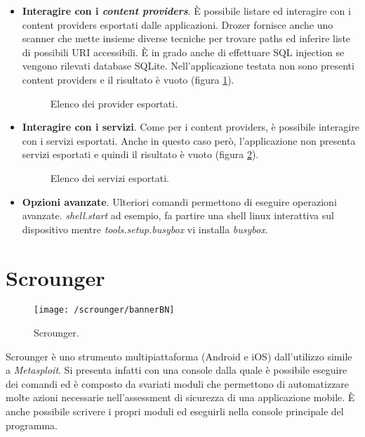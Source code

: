 \begin{itemize}
	\item \textbf{Interagire con i \emph{content providers}}. È possibile listare ed interagire con i content providers esportati dalle applicazioni. Drozer fornisce anche uno scanner che mette insieme diverse tecniche per trovare paths ed inferire liste di possibili URI accessibili. È in grado anche di effettuare SQL injection se vengono rilevati database SQLite. Nell'applicazione testata non sono presenti content providers e il risultato è vuoto (figura \ref{fig:provider}).
	\begin{figure}[h]
		\centering 
		\caption{Elenco dei provider esportati.}
		\label{fig:provider}
	\end{figure}

	\item \textbf{Interagire con i servizi}. Come per i content providers, è possibile interagire con i servizi esportati. Anche in questo caso però, l'applicazione non presenta servizi esportati e quindi il risultato è vuoto (figura \ref{fig:services}).
	\begin{figure}[h]
		\centering 
		\caption{Elenco dei servizi esportati.}
		\label{fig:services}
	\end{figure}

	\item \textbf{Opzioni avanzate}. Ulteriori comandi permettono di eseguire operazioni avanzate. \emph{shell.start} ad esempio, fa partire una shell linux interattiva sul dispositivo mentre \emph{tools.setup.busybox} vi installa \emph{busybox}.
\end{itemize}


\section{Scrounger}
\begin{figure}[h]
	\centering 
	\texttt{[image: /scrounger/bannerBN]} 
	\caption{Scrounger.}
	\label{fig:scrounger}
\end{figure}
Scrounger\cite{Scrounger} è uno strumento multipiattaforma (Android e iOS) dall'utilizzo simile a \emph{Metasploit}. Si presenta infatti con una console dalla quale è possibile eseguire dei comandi ed è composto da svariati moduli che permettono di automatizzare molte azioni necessarie nell'assessment di sicurezza di una applicazione mobile. È anche possibile scrivere i propri moduli ed eseguirli nella console principale del programma.

